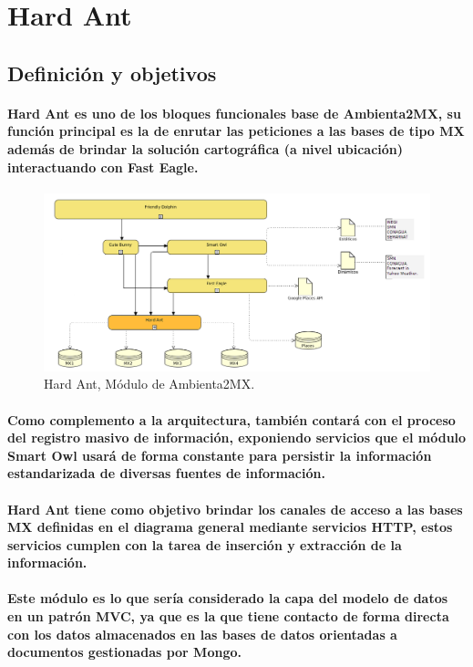 \section{Hard Ant}
  \subsection{Definición y objetivos}    
    \paragraph{Hard Ant es uno de los bloques funcionales base de Ambienta2MX, su función principal es la de enrutar las peticiones a las bases de tipo MX además de brindar la solución cartográfica (a nivel ubicación) interactuando con Fast Eagle.}
    \begin{figure}[h!]
        \centering
          \includegraphics[width=\textwidth]{./images/DiagramaAmbienta2MX_HardAnt.png}
        \caption{Hard Ant, Módulo de Ambienta2MX.}
    \end{figure}
    \paragraph{Como complemento a la arquitectura, también contará con el proceso del registro masivo de información, exponiendo servicios que el módulo Smart Owl usará de forma constante para persistir la información estandarizada de diversas fuentes de información.}
    \paragraph{Hard Ant tiene como objetivo brindar los canales de acceso a las bases MX definidas en el diagrama general mediante servicios HTTP, estos servicios cumplen con la tarea de inserción y extracción de la información. }
    \paragraph{Este módulo es lo que sería considerado la capa del modelo de datos en un patrón MVC, ya que es la que tiene contacto de forma directa con los datos almacenados en las bases de datos orientadas a documentos gestionadas por Mongo.}
